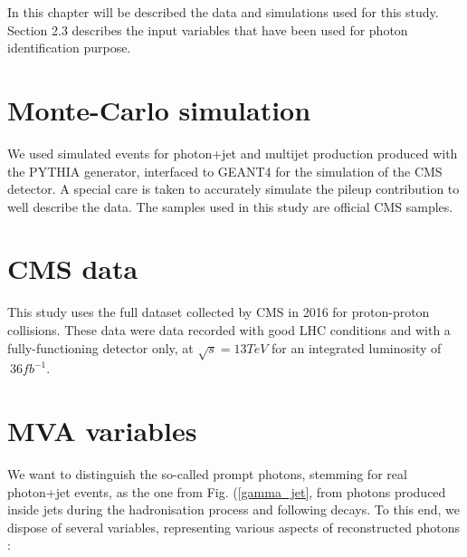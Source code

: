 \label{sec:unchapitre}

In this chapter will be described the data and simulations used for this study. Section 2.3 describes the input
variables that have been used for photon identification purpose.

\section{Monte-Carlo simulation}

We used simulated events for photon+jet and multijet production produced with the PYTHIA generator, interfaced to GEANT4 
for the simulation of the CMS detector. A special care is taken to accurately simulate the pileup contribution to well 
describe the data. The samples used in this study are official CMS samples.

\section{CMS data}

This study uses the full dataset collected by CMS in 2016 for proton-proton collisions. These data were data recorded with good 
LHC conditions and with a fully-functioning detector only, at $\sqrt{s} = 13 TeV$ for an integrated luminosity of $~ 36
fb^{-1}$.
 
\section{MVA variables}

We want to distinguish the so-called prompt photons, stemming for real photon+jet events, as the one from Fig.
(\ref{gamma_jet}, from photons produced inside jets during the hadronisation process and following decays. 
To this end, we dispose of several variables, representing various aspects of reconstructed photons :

